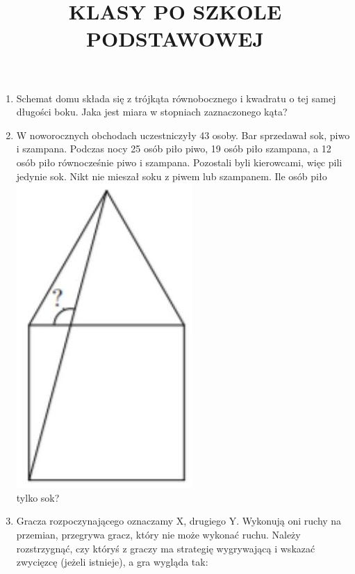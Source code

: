 \documentclass[10pt]{article}
\title{KLASY PO SZKOLE PODSTAWOWEJ }
\author{}
\date{}
\begin{document}
\maketitle
\begin{enumerate}
  \item Schemat domu składa się z trójkąta równobocznego i kwadratu o tej samej długości boku. Jaka jest miara w stopniach zaznaczonego kąta?
  \item W noworocznych obchodach uczestniczyły 43 osoby. Bar sprzedawał sok, piwo i szampana. Podczas nocy 25 osób piło piwo, 19 osób piło szampana, a 12 osób piło równocześnie piwo i szampana. Pozostali byli kierowcami, więc pili jedynie sok. Nikt nie mieszał soku z piwem lub szampanem. Ile osób piło\\
\includegraphics[max width=\textwidth, center]{2024_11_21_73a2cc92c5829e99aadag-1}\\
tylko sok?
  \item Gracza rozpoczynającego oznaczamy X, drugiego Y. Wykonują oni ruchy na przemian, przegrywa gracz, który nie może wykonać ruchu. Należy rozstrzygnąć, czy któryś z graczy ma strategię wygrywającą i wskazać zwycięzcę (jeżeli istnieje), a gra wygląda tak:
\end{enumerate}
\end{document}

